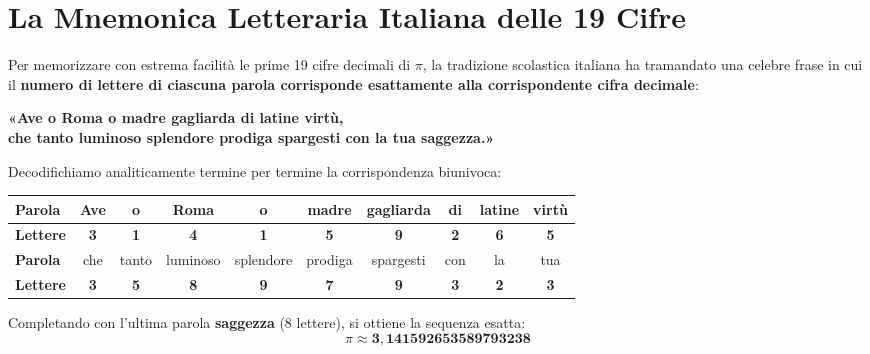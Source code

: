 \documentclass[11pt,a4paper,oneside]{report}
\begin{document}
\section{La Mnemonica Letteraria Italiana delle 19 Cifre}
\begin{aneddoto}
Per memorizzare con estrema facilit\`a le prime 19 cifre decimali di $\pi$, la tradizione scolastica italiana ha tramandato una celebre frase in cui il \textbf{numero di lettere di ciascuna parola corrisponde esattamente alla corrispondente cifra decimale}:
\begin{center}
{\large\textbf{«Ave o Roma o madre gagliarda di latine virt\`u,\\ che tanto luminoso splendore prodiga spargesti con la tua saggezza.»}}
\end{center}
Decodifichiamo analiticamente termine per termine la corrispondenza biunivoca:
\begin{center}
\small
\begin{tabular}{lccccccccc}
\toprule
\textbf{Parola} & Ave & o & Roma & o & madre & gagliarda & di & latine & virt\`u \\
\midrule
\textbf{Lettere} & \textbf{3} & \textbf{1} & \textbf{4} & \textbf{1} & \textbf{5} & \textbf{9} & \textbf{2} & \textbf{6} & \textbf{5} \\
\midrule
\midrule
\textbf{Parola} & che & tanto & luminoso & splendore & prodiga & spargesti & con & la & tua \\
\midrule
\textbf{Lettere} & \textbf{3} & \textbf{5} & \textbf{8} & \textbf{9} & \textbf{7} & \textbf{9} & \textbf{3} & \textbf{2} & \textbf{3} \\
\bottomrule
\end{tabular}
\end{center}
Completando con l'ultima parola \textbf{saggezza} ($8$ lettere), si ottiene la sequenza esatta:
\[
\pi \approx \mathbf{3{,}141592653589793238}
\]
\end{aneddoto}
\end{document}
